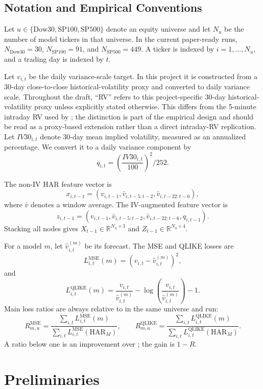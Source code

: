 \documentclass[11pt,a4paper]{article}
\newcommand{\model}[1]{\texttt{\detokenize{#1}}}
\newcommand{\mse}{\mathrm{MSE}}
\newcommand{\ql}{\mathrm{QLIKE}}
\begin{document}
\subsection{Notation and Empirical Conventions}
\label{subsec:notation}

Let \(u\in\{\mathrm{Dow30},\mathrm{SP100},\mathrm{SP500}\}\) denote an equity universe and let \(N_u\) be the number of model tickers in that universe.  In the current paper-ready runs, \(N_{\mathrm{Dow30}}=30\), \(N_{\mathrm{SP100}}=91\), and \(N_{\mathrm{SP500}}=449\).  A ticker is indexed by \(i=1,\ldots,N_u\), and a trading day is indexed by \(t\).

Let \(v_{i,t}\) be the daily variance-scale target.  In this project it is constructed from a 30-day close-to-close historical-volatility proxy and converted to daily variance scale.  Throughout the draft, ``RV'' refers to this project-specific 30-day historical-volatility proxy unless explicitly stated otherwise.  This differs from the 5-minute intraday RV used by \citet{zhang2025gnnhar}; the distinction is part of the empirical design and should be read as a proxy-based extension rather than a direct intraday-RV replication.  Let \(IV30_{i,t}\) denote 30-day mean implied volatility, measured as an annualized percentage.  We convert it to a daily variance component by
\[
q_{i,t}
=
\left(\frac{IV30_{i,t}}{100}\right)^2/252.
\]

The non-IV HAR feature vector is
\[
x_{i,t-1}
=
\left(
v_{i,t-1},
\bar v_{i,t-5:t-2},
\bar v_{i,t-22:t-6}
\right),
\]
where \(\bar v\) denotes a window average.  The IV-augmented feature vector is
\[
z_{i,t-1}
=
\left(
v_{i,t-1},
\bar v_{i,t-5:t-2},
\bar v_{i,t-22:t-6},
q_{i,t-1}
\right).
\]
Stacking all nodes gives \(X_{t-1}\in\mathbb{R}^{N_u\times 3}\) and \(Z_{t-1}\in\mathbb{R}^{N_u\times 4}\).

For a model \(m\), let \(\widehat v_{i,t}^{(m)}\) be its forecast.  The MSE and QLIKE losses are
\[
L^{\mse}_{i,t}(m)
=
\left(v_{i,t}-\widehat v_{i,t}^{(m)}\right)^2,
\]
and
\[
L^{\ql}_{i,t}(m)
=
\frac{v_{i,t}}{\widehat v_{i,t}^{(m)}}
-\log\left(\frac{v_{i,t}}{\widehat v_{i,t}^{(m)}}\right)-1.
\]
Main loss ratios are always relative to \model{HAR_M} in the same universe and run:
\[
R^{\mse}_{m,u}
=
\frac{\sum_{i,t}L^{\mse}_{i,t}(m)}
{\sum_{i,t}L^{\mse}_{i,t}(\mathrm{HAR}_M)},
\qquad
R^{\ql}_{m,u}
=
\frac{\sum_{i,t}L^{\ql}_{i,t}(m)}
{\sum_{i,t}L^{\ql}_{i,t}(\mathrm{HAR}_M)}.
\]
A ratio below one is an improvement over \model{HAR_M}; the gain is \(1-R\).

\section{Preliminaries}
\label{sec:preliminaries}
\end{document}

